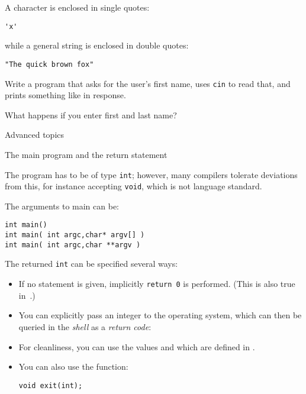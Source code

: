 A character is enclosed in single quotes:
\begin{lstlisting}
'x'
\end{lstlisting}
while a general string is enclosed in double quotes:
\begin{lstlisting}
"The quick brown fox"
\end{lstlisting}

\begin{exercise}
  \label{ex:ask-for-name}
  Write a program that asks for the user's first name, uses
  \lstinline{cin} to read that, and prints
  something like  in response.

  What happens if you enter first and last name?
\end{exercise}

 {Advanced topics}

 {The main program and the return statement}
\label{sec:int-main}

The  program has to be of type \lstinline{int};
however, many compilers tolerate deviations from this,
for instance accepting \lstinline{void},
which is not language standard.

The arguments to main can be:
\begin{lstlisting}
int main() 
int main( int argc,char* argv[] ) 
int main( int argc,char **argv ) 
\end{lstlisting}

The returned \lstinline{int} can be specified several ways:
\begin{itemize}
\item If no  statement is given,
  implicitly \lstinline+return 0+ is performed.
  (This is also true in~.)
\item You can explicitly pass an integer to the operating system,
  which can then be queried in the 
  \emph{shell} as a \emph{return code}:
\item For cleanliness, you can use the values
   and 
  which are defined in .
\item You can also use the  function:
\begin{lstlisting}
void exit(int);
\end{lstlisting}
\end{itemize}

